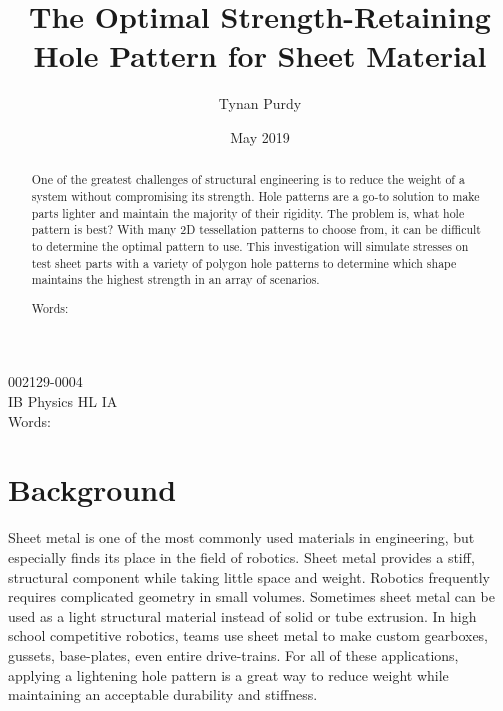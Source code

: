 \documentclass[12pt, letterpaper]{article}
\title{The Optimal Strength-Retaining Hole Pattern for Sheet Material}
\author{Tynan Purdy}
\date{May 2019}
\begin{document}
\large
\doublespace{}
\parindent=0.5in

{\fontsize{12}{14.4}
  {\singlespace
    \maketitle
    \begin{center}
    002129-0004 \\
    \vspace{4mm}
    IB Physics HL IA \\
    \vspace{4mm}
    Words:  \\ %
    \end{center}
  }
}	

\newpage
{}

\begin{abstract}
One of the greatest challenges of structural engineering is to reduce the weight of a system without compromising its strength. Hole patterns are a go-to solution to make parts lighter and maintain the majority of their rigidity. The problem is, what hole pattern is best? With many 2D tessellation patterns to choose from, it can be difficult to determine the optimal pattern to use. This investigation will simulate stresses on test sheet parts with a variety of polygon hole patterns to determine which shape maintains the highest strength in an array of scenarios. 

Words: %

\end{abstract}

\newpage
\tableofcontents
\newpage

\section{Background}

Sheet metal is one of the most commonly used materials in engineering, but especially finds its place in the field of robotics. Sheet metal provides a stiff, structural component while taking little space and weight. Robotics frequently requires complicated geometry in small volumes. Sometimes sheet metal can be used as a light structural material instead of solid or tube extrusion. In high school competitive robotics, teams use sheet metal to make custom gearboxes, gussets, base-plates, even entire drive-trains. For all of these applications, applying a lightening hole pattern is a great way to reduce weight while maintaining an acceptable durability and stiffness.
\end{document}
